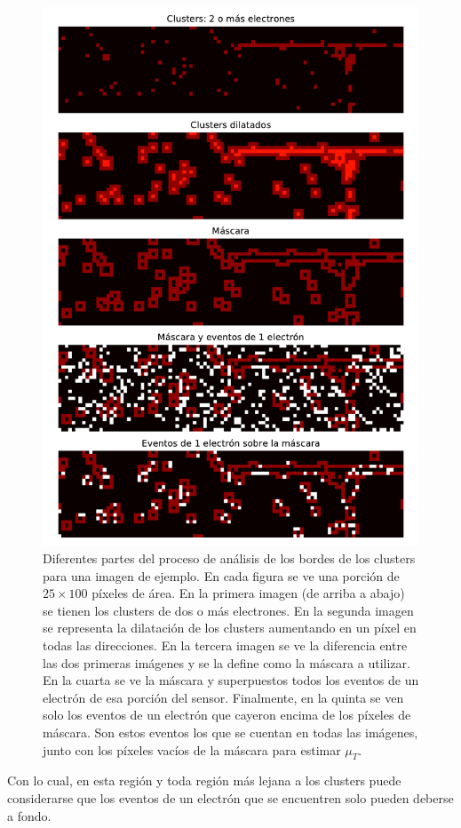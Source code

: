 \begin{figure}[H]
    \centering
    \includegraphics[scale=0.65]{Figs/analisis_bordes.pdf}
    \caption{Diferentes partes del proceso de análisis de los bordes de los clusters para una imagen de ejemplo. En cada figura se ve una porción de $25 \times 100$ píxeles de área. En la primera imagen (de arriba a abajo) se tienen los clusters de dos o más electrones. En la segunda imagen se representa la dilatación de los clusters aumentando en un píxel en todas las direcciones. En la tercera imagen se ve la diferencia entre las dos primeras imágenes y se la define como la máscara a utilizar. En la cuarta se ve la máscara y superpuestos todos los eventos de un electrón de esa porción del sensor. Finalmente, en la quinta se ven solo los eventos de un electrón que cayeron encima de los píxeles de máscara. Son estos eventos los que se cuentan en todas las imágenes, junto con los píxeles vacíos de la máscara para estimar $\mu_{T}$.}
    \label{fig:AnalisisBordes}
\end{figure}
Con lo cual, en esta región y toda región más lejana a los clusters puede considerarse que los eventos de un electrón que se encuentren solo pueden deberse a fondo.

